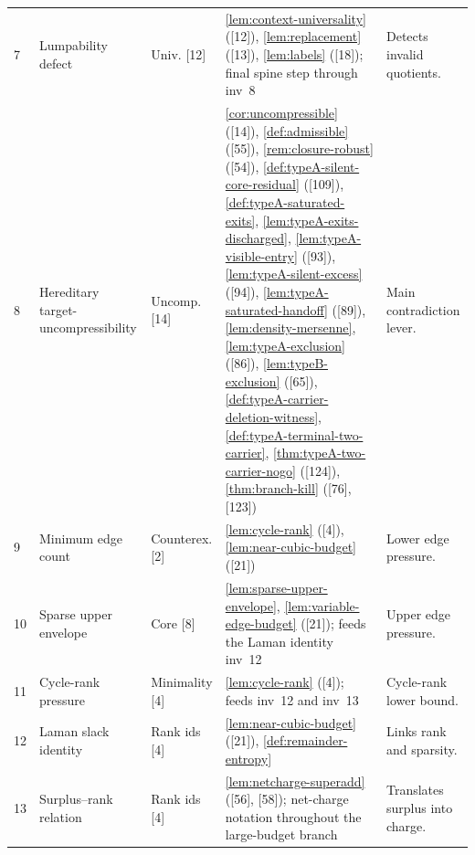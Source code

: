 \documentclass[11pt]{article}
\begin{document}
{\begin{longtable}{C{0.032\textwidth} L{0.145\textwidth} L{0.105\textwidth} L{0.50\textwidth} L{0.155\textwidth}}
7 & Lumpability defect & Univ. {[12]} & \cref{lem:context-universality} ([12]), \cref{lem:replacement} ([13]), \cref{lem:labels} ([18]); final spine step through inv~8 & Detects invalid quotients. \\
8 & Hereditary target-uncompressibility & Uncomp. {[14]} & \cref{cor:uncompressible} ([14]), \cref{def:admissible} ([55]), \cref{rem:closure-robust} ([54]), \cref{def:typeA-silent-core-residual} ([109]), \cref{def:typeA-saturated-exits}, \cref{lem:typeA-exits-discharged}, \cref{lem:typeA-visible-entry} ([93]), \cref{lem:typeA-silent-excess} ([94]), \cref{lem:typeA-saturated-handoff} ([89]), \cref{lem:density-mersenne}, \cref{lem:typeA-exclusion} ([86]), \cref{lem:typeB-exclusion} ([65]), \cref{def:typeA-carrier-deletion-witness}, \cref{def:typeA-terminal-two-carrier}, \cref{thm:typeA-two-carrier-nogo} ([124]), \cref{thm:branch-kill} ([76], [123]) & Main contradiction lever. \\
9 & Minimum edge count & Counterex. {[2]} & \cref{lem:cycle-rank} ([4]), \cref{lem:near-cubic-budget} ([21]) & Lower edge pressure. \\
10 & Sparse upper envelope & Core {[8]} & \cref{lem:sparse-upper-envelope}, \cref{lem:variable-edge-budget} ([21]); feeds the Laman identity inv~12 & Upper edge pressure. \\
11 & Cycle-rank pressure & Minimality {[4]} & \cref{lem:cycle-rank} ([4]); feeds inv~12 and inv~13 & Cycle-rank lower bound. \\
12 & Laman slack identity & Rank ids {[4]} & \cref{lem:near-cubic-budget} ([21]), \cref{def:remainder-entropy} & Links rank and sparsity. \\
13 & Surplus--rank relation & Rank ids {[4]} & \cref{lem:netcharge-superadd} ([56], [58]); net-charge notation throughout the large-budget branch & Translates surplus into charge. \\

\end{longtable}}
\end{document}
